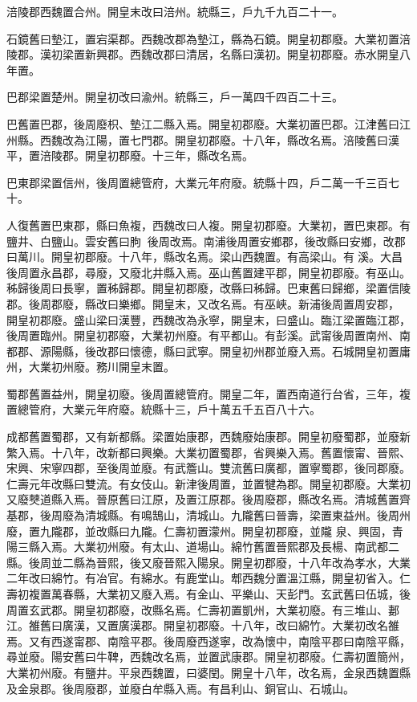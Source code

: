 \begin{pinyinscope}
 涪陵郡西魏置合州。開皇末改曰涪州。統縣三，戶九千九百二十一。



 石鏡舊曰墊江，置宕渠郡。西魏改郡為墊江，縣為石鏡。開皇初郡廢。大業初置涪陵郡。漢初梁置新興郡。西魏改郡曰清居，名縣曰漢初。開皇初郡廢。赤水開皇八年置。



 巴郡梁置楚州。開皇初改曰渝州。統縣三，戶一萬四千四百二十三。



 巴舊置巴郡，後周廢枳、墊江二縣入焉。開皇初郡廢。大業初置巴郡。江津舊曰江州縣。西魏改為江陽，置七門郡。開皇初郡廢。十八年，縣改名焉。涪陵舊曰漢平，置涪陵郡。開皇初郡廢。十三年，縣改名焉。



 巴東郡梁置信州，後周置總管府，大業元年府廢。統縣十四，戶二萬一千三百七十。



 人復舊置巴東郡，縣曰魚複，西魏改曰人複。開皇初郡廢。大業初，置巴東郡。有鹽井、白鹽山。雲安舊曰朐，後周改焉。南浦後周置安鄉郡，後改縣曰安鄉，改郡曰萬川。開皇初郡廢。十八年，縣改名焉。梁山西魏置。有高梁山。有溪。大昌後周置永昌郡，尋廢，又廢北井縣入焉。巫山舊置建平郡，開皇初郡廢。有巫山。秭歸後周曰長寧，置秭歸郡。開皇初郡廢，改縣曰秭歸。巴東舊曰歸鄉，梁置信陵郡。後周郡廢，縣改曰樂鄉。開皇末，又改名焉。有巫峽。新浦後周置周安郡，
 開皇初郡廢。盛山梁曰漢豐，西魏改為永寧，開皇末，曰盛山。臨江梁置臨江郡，後周置臨州。開皇初郡廢，大業初州廢。有平都山。有彭溪。武甯後周置南州、南都郡、源陽縣，後改郡曰懷德，縣曰武寧。開皇初州郡並廢入焉。石城開皇初置庸州，大業初州廢。務川開皇末置。



 蜀郡舊置益州，開皇初廢。後周置總管府。開皇二年，置西南道行台省，三年，複置總管府，大業元年府廢。統縣十三，戶十萬五千五百八十六。



 成都舊置蜀郡，又有新都縣。梁置始康郡，西魏廢始康郡。開皇初廢蜀郡，並廢新繁入焉。十八年，改新都曰興樂。大業初置蜀郡，省興樂入焉。舊置懷甯、晉熙、宋興、宋寧四郡，至後周並廢。有武簷山。雙流舊曰廣都，置寧蜀郡，後同郡廢。仁壽元年改縣曰雙流。有女伎山。新津後周置，並置犍為郡。開皇初郡廢。大業初又廢僰道縣入焉。晉原舊曰江原，及置江原郡。後周廢郡，縣改名焉。清城舊置齊基郡，後周廢為清城縣。有鳴鵠山，清城山。九隴舊曰晉壽，梁置東益州。後周州廢，置九隴郡，並改縣曰九隴。仁壽初置濛州。開皇初郡廢，並隴
 泉、興固，青陽三縣入焉。大業初州廢。有太山、道場山。綿竹舊置晉熙郡及長楊、南武都二縣。後周並二縣為晉熙，後又廢晉熙入陽泉。開皇初郡廢，十八年改為孝水，大業二年改曰綿竹。有冶官。有綿水。有鹿堂山。郫西魏分置溫江縣，開皇初省入。仁壽初複置萬春縣，大業初又廢入焉。有金山、平樂山、天彭門。玄武舊曰伍城，後周置玄武郡。開皇初郡廢，改縣名焉。仁壽初置凱州，大業初廢。有三堆山、郪江。雒舊曰廣漢，又置廣漢郡。開皇初郡廢。十八年，改曰綿竹。大業初改名雒焉。又有西遂甯郡、南陰平郡。後周廢西遂寧，改為懷中，南陰平郡曰南陰平縣，尋並廢。陽安舊曰牛鞞，西魏改名焉，並置武康郡。開皇初郡廢。仁壽初置簡州，大業初州廢。有鹽井。平泉西魏置，曰婆閏。開皇十八年，改名焉，金泉西魏置縣及金泉郡。後周廢郡，並廢白牟縣入焉。有昌利山、銅官山、石城山。




\end{pinyinscope}
